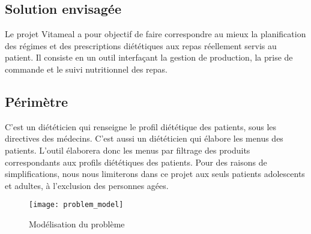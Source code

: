 \subsection{Solution envisagée}
Le projet Vitameal a pour objectif de faire correspondre au mieux la planification des régimes et des
prescriptions diététiques aux repas réellement servis au patient. Il consiste en un outil interfaçant la
gestion de production, la prise de commande et le suivi nutritionnel des repas.

\subsection{Périmètre}
C'est un diététicien qui renseigne le profil diététique des patients,
sous les directives des médecins. C'est aussi un diététicien qui élabore
les menus des patients. L'outil élaborera donc
les menus par filtrage des produits correspondants aux profils
diététiques des patients. Pour des raisons de simplifications, nous nous limiterons dans ce projet aux seuls patients adolescents et adultes, à l'exclusion des personnes agées.
\begin{figure}[H]
\label{Modelisation_du _probleme}
  \centering
      \texttt{[image: problem\_model]} %
\caption{Modélisation du problème}
\end{figure}

